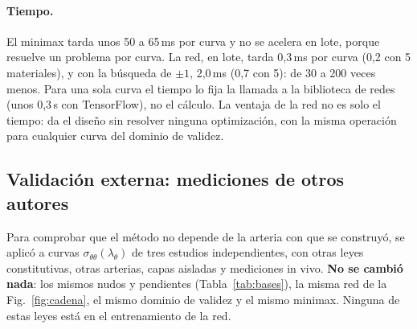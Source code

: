 \paragraph{Tiempo.} El minimax tarda unos 50 a 65\,ms por curva y no se acelera en lote, porque resuelve un problema por curva. La red, en lote, tarda 0,3\,ms por curva (0,2 con 5 materiales), y con la búsqueda de $\pm1$, 2,0\,ms (0,7 con 5): de 30 a 200 veces menos. Para una sola curva el tiempo lo fija la llamada a la biblioteca de redes (unos 0,3\,s con TensorFlow), no el cálculo. La ventaja de la red no es solo el tiempo: da el diseño sin resolver ninguna optimización, con la misma operación para cualquier curva del dominio de validez.

\subsection{Validación externa: mediciones de otros autores}\label{sec:externa}
Para comprobar que el método no depende de la arteria con que se construyó, se aplicó a curvas $\sigma_{\theta\theta}(\lambda_\theta)$ de tres estudios independientes, con otras leyes constitutivas, otras arterias, capas aisladas y mediciones in vivo. \textbf{No se cambió nada}: los mismos nudos y pendientes (Tabla~\ref{tab:bases}), la misma red de la Fig.~\ref{fig:cadena}, el mismo dominio de validez y el mismo minimax. Ninguna de estas leyes está en el entrenamiento de la red.

